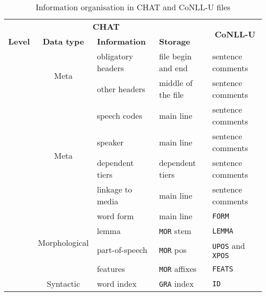 \begin{table}[h!]
\caption {Information organisation in CHAT and CoNLL-U files} \label{tab:info}
\centering
\begin{tabularx}{\widefigurewidth}{@{}lcXll@{}}
\toprule
\multicolumn{4}{c}{\textbf{CHAT}}& \multicolumn{1}{c}{\multirow{2}{*}{\textbf{CoNLL-U}}}\\
\cmidrule(lr){1-4}
\textbf{Level}& \textbf{Data type} & \textbf{Information} & \textbf{Storage} &\multicolumn{1}{l}{}\\
\midrule\addlinespace
\multicolumn{1}{l}{\multirow{2}{*}{\textbf{File}}}&\multicolumn{1}{c}{\multirow{2}{*}{Meta}}& obligatory headers    & file begin and end & sentence comments\\
\multicolumn{1}{l}{\multirow{2}{*}{}}&\multicolumn{1}{c}{\multirow{2}{*}{}}& other headers  & middle of the file & sentence comments\\\addlinespace
\cmidrule[0.1pt](lr{1.75em}){1-3}
\addlinespace
\multicolumn{1}{l}{\multirow{4}{*}{\textbf{Sentence}}}&\multicolumn{1}{c}{\multirow{4}{*}{Meta}}& speech codes & main line & sentence comments\\
\multicolumn{1}{l}{\multirow{4}{*}{}}&\multicolumn{1}{c}{\multirow{4}{*}{}}& speaker          & main line & sentence comments\\
\multicolumn{1}{l}{\multirow{4}{*}{}}&\multicolumn{1}{c}{\multirow{4}{*}{}}& dependent tiers  & dependent tiers & sentence comments\\
\multicolumn{1}{l}{\multirow{4}{*}{}}&\multicolumn{1}{c}{\multirow{4}{*}{}}& linkage to media  & main line & sentence comments\\\addlinespace
\cmidrule[0.1pt](lr{1.75em}){1-3}
\addlinespace
\multicolumn{1}{l}{\multirow{11}{*}{\textbf{Token}}}  &\multicolumn{1}{c}{\multirow{4}{*}{Morphological}}& word form         & main line & \texttt{FORM}\\
\multicolumn{1}{l}{\multirow{11}{*}{}}&\multicolumn{1}{c}{\multirow{4}{*}{}}& lemma           & \texttt{MOR} stem& \texttt{LEMMA}\\
\multicolumn{1}{l}{\multirow{11}{*}{}}&\multicolumn{1}{c}{\multirow{4}{*}{}}& part-of-speech  & \texttt{MOR} pos& \texttt{UPOS} and \texttt{XPOS}\\
\multicolumn{1}{l}{\multirow{11}{*}{}}&\multicolumn{1}{c}{\multirow{4}{*}{}}& features        & \texttt{MOR} affixes& \texttt{FEATS}\\\addlinespace
\multicolumn{1}{l}{\multirow{11}{*}{}}&\multicolumn{1}{c}{\multirow{3}{*}{Syntactic}}& word index      & \texttt{GRA} index& \texttt{ID}\\

\end{tabularx}
\end{table}

